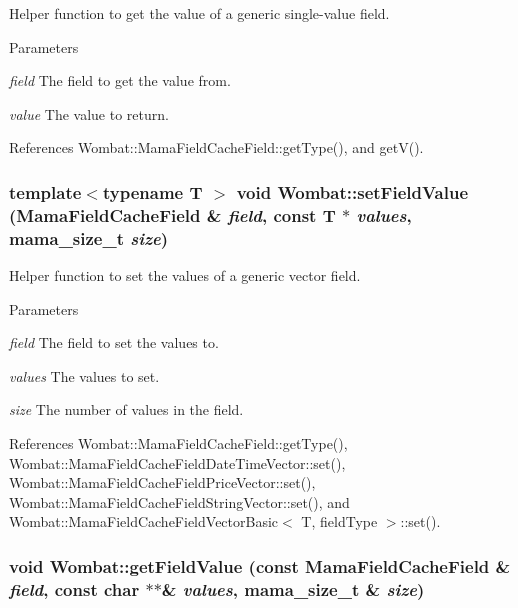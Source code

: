 Helper function to get the value of a generic single-\/value field. 
\begin{DoxyParams}{Parameters}
\item[{\em field}]The field to get the value from. \item[{\em value}]The value to return. \end{DoxyParams}


References Wombat::MamaFieldCacheField::getType(), and getV().\hypertarget{namespaceWombat_a959adfb20a05c253efbc74279136ba94}{
\subsubsection[{setFieldValue}]{\setlength{\rightskip}{0pt plus 5cm}template$<$typename T $>$ void Wombat::setFieldValue (MamaFieldCacheField \& {\em field}, \/  const T $\ast$ {\em values}, \/  {\bf mama\_\-size\_\-t} {\em size})}}
\label{namespaceWombat_a959adfb20a05c253efbc74279136ba94}


Helper function to set the values of a generic vector field. 
\begin{DoxyParams}{Parameters}
\item[{\em field}]The field to set the values to. \item[{\em values}]The values to set. \item[{\em size}]The number of values in the field. \end{DoxyParams}


References Wombat::MamaFieldCacheField::getType(), Wombat::MamaFieldCacheFieldDateTimeVector::set(), Wombat::MamaFieldCacheFieldPriceVector::set(), Wombat::MamaFieldCacheFieldStringVector::set(), and Wombat::MamaFieldCacheFieldVectorBasic$<$ T, fieldType $>$::set().\hypertarget{namespaceWombat_a07930ae65ae71490a8f74ea0ae7ab013}{
\subsubsection[{getFieldValue}]{\setlength{\rightskip}{0pt plus 5cm}void Wombat::getFieldValue (const MamaFieldCacheField \& {\em field}, \/  const char $\ast$$\ast$\& {\em values}, \/  {\bf mama\_\-size\_\-t} \& {\em size})}}
\label{namespaceWombat_a07930ae65ae71490a8f74ea0ae7ab013}


